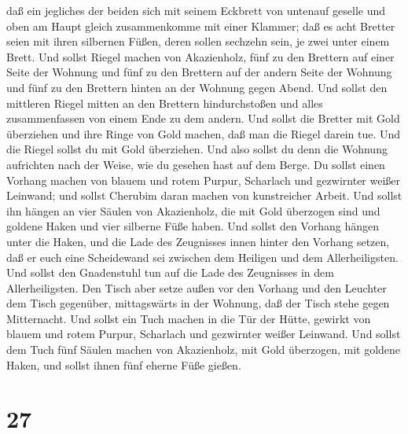 daß ein jegliches der beiden sich mit seinem Eckbrett von untenauf
geselle und oben am Haupt gleich zusammenkomme mit einer Klammer;
 daß es acht Bretter seien mit ihren silbernen Füßen, deren
sollen sechzehn sein, je zwei unter einem Brett.  Und
sollst Riegel machen von Akazienholz, fünf zu den Brettern auf einer
Seite der Wohnung  und fünf zu den Brettern auf der andern
Seite der Wohnung und fünf zu den Brettern hinten an der Wohnung gegen
Abend.  Und sollst den mittleren Riegel mitten an den
Brettern hindurchstoßen und alles zusammenfassen von einem Ende zu dem
andern.  Und sollst die Bretter mit Gold überziehen und
ihre Ringe von Gold machen, daß man die Riegel darein tue. 
Und die Riegel sollst du mit Gold überziehen. Und also sollst du denn
die Wohnung aufrichten nach der Weise, wie du gesehen hast auf dem
Berge.  Du sollst einen Vorhang machen von blauem und rotem
Purpur, Scharlach und gezwirnter weißer Leinwand; und sollst Cherubim
daran machen von kunstreicher Arbeit.  Und sollst ihn
hängen an vier Säulen von Akazienholz, die mit Gold überzogen sind und
goldene Haken und vier silberne Füße haben.  Und sollst den
Vorhang hängen unter die Haken, und die Lade des Zeugnisses innen hinter
den Vorhang setzen, daß er euch eine Scheidewand sei zwischen dem
Heiligen und dem Allerheiligsten.  Und sollst den
Gnadenstuhl tun auf die Lade des Zeugnisses in dem Allerheiligsten.
 Den Tisch aber setze außen vor den Vorhang und den
Leuchter dem Tisch gegenüber, mittagswärts in der Wohnung, daß der Tisch
stehe gegen Mitternacht.  Und sollst ein Tuch machen in die
Tür der Hütte, gewirkt von blauem und rotem Purpur, Scharlach und
gezwirnter weißer Leinwand.  Und sollst dem Tuch fünf
Säulen machen von Akazienholz, mit Gold überzogen, mit goldene Haken,
und sollst ihnen fünf eherne Füße gießen.

\hypertarget{section-26}{%
\section{27}\label{section-26}}

